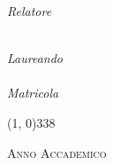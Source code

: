 \begin{titlepage}
\begin{center}
        \begin{large}
            \begin{flushleft}
                \textit{Relatore}\\
                \vspace{5pt}
                \profTitle\ \myProf
            \end{flushleft}

            \vspace{-52pt}

            \begin{flushright}
                \textit{Laureando}\\
                \vspace{5pt}
                \myName \\
                \vspace{5pt}
                \textit{Matricola} \myID
            \end{flushright}
        \end{large}

        \vspace{40pt}

        \line(1, 0){338} \\
        \begin{normalsize}
            \textsc{Anno Accademico \myAA}
        \end{normalsize}
    \end{center}
\end{titlepage}
